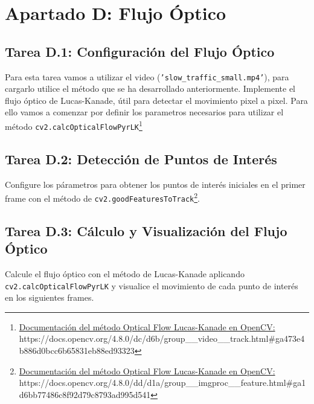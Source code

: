 \chapter{Apartado D: \textbf{Flujo Óptico}}
\label{chapter:tarea_d}

\section*{Tarea D.1: Configuración del Flujo Óptico}
{}
Para esta tarea vamos a utilizar el video (\texttt{'slow\_traffic\_small.mp4'}), para cargarlo utilice el método que se ha desarrollado anteriormente.
Implemente el flujo óptico de Lucas-Kanade, útil para detectar el movimiento pixel a pixel. Para ello vamos a comenzar por definir los parametros necesarios para utilizar el método \texttt{cv2.calcOpticalFlowPyrLK}\footnote{ \href{https://docs.opencv.org/4.8.0/dc/d6b/group\_\_video\_\_track.html\#ga473e4b886d0bcc6b65831eb88ed93323}{Documentación del método Optical Flow Lucas-Kanade en OpenCV:} \\{https://docs.opencv.org/4.8.0/dc/d6b/group\_\_video\_\_track.html\#ga473e4b886d0bcc6b65831eb88ed93323}}

\section*{Tarea D.2: Detección de Puntos de Interés}
{}
Configure los párametros para obtener los puntos de interés iniciales en el primer frame con el método de \texttt{cv2.goodFeaturesToTrack}\footnote{ \href{https://docs.opencv.org/4.8.0/dd/d1a/group\_\_imgproc\_\_feature.html\#ga1d6bb77486c8f92d79c8793ad995d541}{Documentación del método Optical Flow Lucas-Kanade en OpenCV:} \\{https://docs.opencv.org/4.8.0/dd/d1a/group\_\_imgproc\_\_feature.html\#ga1d6bb77486c8f92d79c8793ad995d541}}.

\section*{Tarea D.3: Cálculo y Visualización del Flujo Óptico}
{}
Calcule el flujo óptico con el método de Lucas-Kanade aplicando \texttt{cv2.calcOpticalFlowPyrLK} y visualice el movimiento de cada punto de interés en los siguientes frames.

